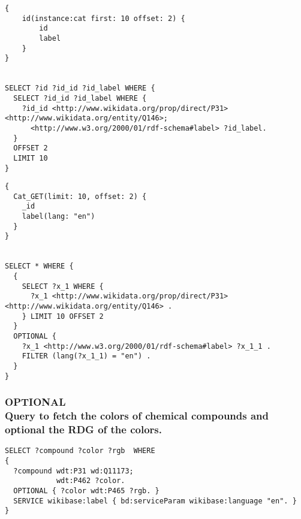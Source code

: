 \begin{minipage}{\linewidth}
\begin{lstlisting}[label=listing:listing35, caption={Query 1 - GraphQL-LD}]
{
    id(instance:cat first: 10 offset: 2) {
        id
        label
    }
}


SELECT ?id ?id_id ?id_label WHERE {
  SELECT ?id_id ?id_label WHERE {
    ?id_id <http://www.wikidata.org/prop/direct/P31> <http://www.wikidata.org/entity/Q146>;
      <http://www.w3.org/2000/01/rdf-schema#label> ?id_label.
  }
  OFFSET 2
  LIMIT 10
}
\end{lstlisting}
\end{minipage}




\begin{minipage}{\linewidth}
\begin{lstlisting}[label=listing:listing36, caption={Query 1 - HypergraphQL}]
{
  Cat_GET(limit: 10, offset: 2) {
    _id
    label(lang: "en")
  }
}


SELECT * WHERE {
  {
    SELECT ?x_1 WHERE {
      ?x_1 <http://www.wikidata.org/prop/direct/P31> <http://www.wikidata.org/entity/Q146> .
    } LIMIT 10 OFFSET 2
  }
  OPTIONAL {
    ?x_1 <http://www.w3.org/2000/01/rdf-schema#label> ?x_1_1 .
    FILTER (lang(?x_1_1) = "en") .
  }
}
\end{lstlisting}
\end{minipage}


\subsubsection{OPTIONAL \\Query to fetch the colors of chemical compounds and optional the RDG of the colors.}

\begin{minipage}{\linewidth}
\begin{lstlisting}[label=listing:listing37, caption={Query 2}]
SELECT ?compound ?color ?rgb  WHERE
{
  ?compound wdt:P31 wd:Q11173;
            wdt:P462 ?color.
  OPTIONAL { ?color wdt:P465 ?rgb. }
  SERVICE wikibase:label { bd:serviceParam wikibase:language "en". }
}
\end{lstlisting}
\end{minipage}


